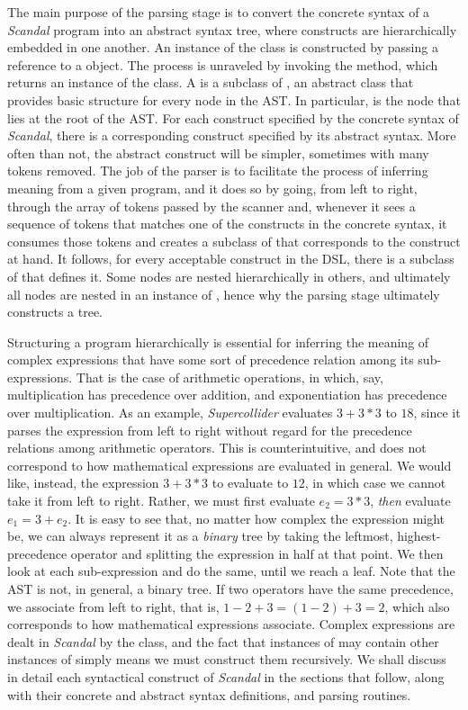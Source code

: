 The main purpose of the parsing stage is to convert the concrete syntax of a \emph{Scandal} program into an abstract syntax tree, where constructs are hierarchically embedded in one another. An instance of the  class is constructed by passing a reference to a  object. The process is unraveled by invoking the  method, which returns an instance of the  class. A  is a subclass of , an abstract class that provides basic structure for every node in the AST. In particular,  is the node that lies at the root of the AST. For each construct specified by the concrete syntax of \emph{Scandal}, there is a corresponding construct specified by its abstract syntax. More often than not, the abstract construct will be simpler, sometimes with many tokens removed. The job of the parser is to facilitate the process of inferring meaning from a given program, and it does so by going, from left to right, through the array of tokens passed by the scanner and, whenever it sees a sequence of tokens that matches one of the constructs in the concrete syntax, it consumes those tokens and creates a subclass of  that corresponds to the construct at hand. It follows, for every acceptable construct in the DSL, there is a subclass of  that defines it. Some nodes are nested hierarchically in others, and ultimately all nodes are nested in an instance of , hence why the parsing stage ultimately constructs a tree.

Structuring a program hierarchically is essential for inferring the meaning of complex expressions that have some sort of precedence relation among its sub-expressions. That is the case of arithmetic operations, in which, say, multiplication has precedence over addition, and exponentiation has precedence over multiplication. As an example, \emph{Supercollider} evaluates $3 + 3 * 3$ to $18$, since it parses the expression from left to right without regard for the precedence relations among arithmetic operators. This is counterintuitive, and does not correspond to how mathematical expressions are evaluated in general. We would like, instead, the expression $3 + 3 * 3$ to evaluate to $12$, in which case we cannot take it from left to right. Rather, we must first evaluate $e_2 = 3 * 3$, \emph{then} evaluate $e_1 = 3 + e_2$. It is easy to see that, no matter how complex the expression might be, we can always represent it as a \emph{binary} tree by taking the leftmost, highest-precedence operator and splitting the expression in half at that point. We then look at each sub-expression and do the same, until we reach a leaf. Note that the AST is not, in general, a binary tree. If two operators have the same precedence, we associate from left to right, that is, $1 - 2 + 3 = (1 - 2) + 3 = 2$, which also corresponds to how mathematical expressions associate. Complex expressions are dealt in \emph{Scandal} by the  class, and the fact that instances of  may contain other instances of  simply means we must construct them recursively. We shall discuss in detail each syntactical construct of \emph{Scandal} in the sections that follow, along with their concrete and abstract syntax definitions, and parsing routines.

